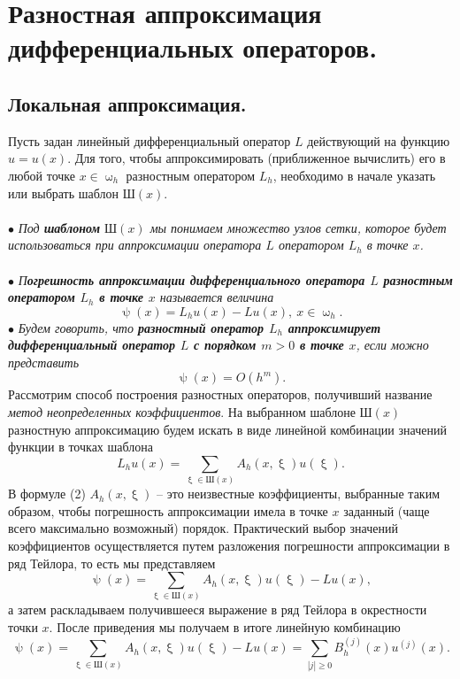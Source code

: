 \documentclass[a4paper, 12pt]{report}
\numberwithin{equation}{section}
\renewcommand{\geq}{\geqslant}
\renewcommand{\psi}{\uppsi}
\renewcommand{\omega}{\upomega}
\renewcommand{\xi}{\upxi}
\begin{document}
\section{Разностная аппроксимация дифференциальных операторов.}
\subsection{Локальная аппроксимация.}
Пусть задан линейный дифференциальный оператор $L$ действующий на функцию $u=u(x)$. Для того, чтобы аппроксимировать (приближенное вычислить) его в любой точке $x\in \omega _h$ разностным оператором $L_h$, необходимо в начале указать или выбрать шаблон $\text {Ш} (x)$. \\\\
$\bullet$ \textit{Под \textbf{шаблоном} $\text{Ш}(x)$ мы понимаем множество узлов сетки, которое будет использоваться при аппроксимации оператора $L$ оператором $L_h$ в точке $x$.}\\\\
$\bullet$ \textit{П\textbf{огрешность аппроксимации дифференциального оператора $L$ разностным оператором $L_h$ в точке $x$} называется величина }
\begin{equation}
\psi(x) = L_hu(x) - Lu(x),\ x\in \omega_h.
\end{equation}
$\bullet$ \textit{Будем говорить, что \textbf{разностный оператор $L_h$ аппроксимирует дифференциальный оператор $L$ с порядком $m>0$ в точке $x$}, если можно представить} $$\psi(x) = O(h^m).$$
Рассмотрим способ построения разностных операторов, получивший название \textit{метод неопределенных коэффициентов}. На выбранном шаблоне $\text{Ш}(x)$ разностную аппроксимацию будем искать в виде линейной комбинации значений функции в точках шаблона \begin{equation}
L_hu(x) = \sum_{\xi \in \text{Ш}(x)} A_h(x, \xi) u(\xi).
\end{equation}
В формуле (2) $A_h(x, \xi)$ -- это неизвестные коэффициенты, выбранные таким образом, чтобы погрешность аппроксимации имела в точке $x$ заданный (чаще всего максимально возможный) порядок. Практический выбор значений коэффициентов осуществляется путем разложения погрешности аппроксимации в ряд Тейлора, то есть мы представляем $$\psi(x) = \sum_{\xi \in \text{Ш}(x)} A_h(x, \xi) u(\xi) - Lu(x),$$
а затем раскладываем получившееся выражение в ряд Тейлора в окрестности точки $x$. После приведения мы получаем в итоге линейную комбинацию 
$$\psi(x) = \sum_{\xi \in \text{Ш}(x)} A_h(x, \xi) u(\xi) - Lu(x) = \sum_{|j|\geq 0} B_h^{(j)}(x) u^{(j)}(x).$$
\end{document}
